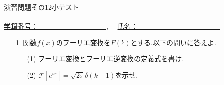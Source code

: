\documentclass[11pt]{jarticle}
\begin{document}
\begin{center}
{\Large
演習問題その12小テスト}\\
\ \\
\underline{学籍番号：　　　　　　　　　　},　
\underline{氏名：　　　　　　　　　　　　}
\end{center}
\begin{enumerate}
\item[1.]関数$f(x)$のフーリエ変換を$F(k)$とする.以下の問いに答えよ.
\begin{enumerate}
\item[(1)] フーリエ変換とフーリエ逆変換の定義式を書け.
\item[(2)] $\mathcal{F}[e^{ix}]=\sqrt{2\pi}\delta (k-1)$を示せ.
\end{enumerate}

\end{enumerate}
\end{document}
